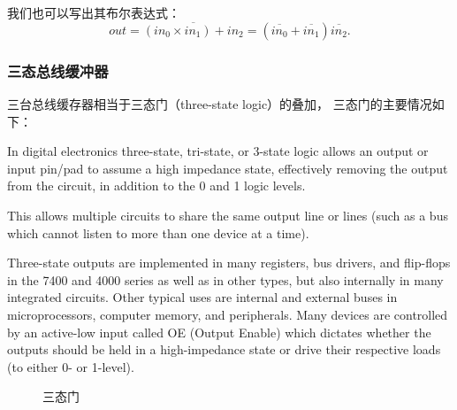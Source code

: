 \documentclass[11pt]{SEU-Digital-Report}
\begin{document}
                我们也可以写出其布尔表达式：
                \begin{equation}\label{eq:1_logic}
                    out=\overline{(in_0\times in_1)+in_2}=(\overline{in_0}+\overline{in_1})\overline{in_2}.
                \end{equation}

            \subsubsection{三态总线缓冲器}

                三台总线缓存器相当于三态门（three-state logic）的叠加，
                三态门的主要情况如下\cite{wiki:3logic}：

                In digital electronics three-state, tri-state, or 3-state logic allows an output or input pin/pad to assume a high impedance state, effectively removing the output from the circuit, in addition to the 0 and 1 logic levels.

                This allows multiple circuits to share the same output line or lines (such as a bus which cannot listen to more than one device at a time).
                
                Three-state outputs are implemented in many registers, bus drivers, and flip-flops in the 7400 and 4000 series as well as in other types, but also internally in many integrated circuits. Other typical uses are internal and external buses in microprocessors, computer memory, and peripherals. Many devices are controlled by an active-low input called OE (Output Enable) which dictates whether the outputs should be held in a high-impedance state or drive their respective loads (to either 0- or 1-level).

                \begin{figure}[htbp]
                    \centering
                    \qquad
                    \caption{三态门\cite{wiki:3logic}}
                    \label{fig:3logic}
                \end{figure}
\end{document}
